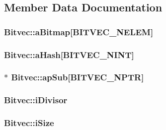 \subsection{Member Data Documentation}
\hypertarget{struct_bitvec_ad0c8d2bbafe74c346a007004086fb56d}{
\subsubsection[{a\-Bitmap}]{ Bitvec\-::a\-Bitmap\mbox{[}{\bf B\-I\-T\-V\-E\-C\-\_\-\-N\-E\-L\-E\-M}\mbox{]}}}\label{struct_bitvec_ad0c8d2bbafe74c346a007004086fb56d}
\hypertarget{struct_bitvec_adcaa47179c109270041bf59f8fe9f8ff}{
\subsubsection[{a\-Hash}]{ Bitvec\-::a\-Hash\mbox{[}{\bf B\-I\-T\-V\-E\-C\-\_\-\-N\-I\-N\-T}\mbox{]}}}\label{struct_bitvec_adcaa47179c109270041bf59f8fe9f8ff}
\hypertarget{struct_bitvec_ab4942527f1862bbd8e1ffe45486d1541}{
\subsubsection[{ap\-Sub}]{$\ast$ Bitvec\-::ap\-Sub\mbox{[}{\bf B\-I\-T\-V\-E\-C\-\_\-\-N\-P\-T\-R}\mbox{]}}}\label{struct_bitvec_ab4942527f1862bbd8e1ffe45486d1541}
\hypertarget{struct_bitvec_a22cdb23eb424e07b6ce922de018a83d9}{
\subsubsection[{i\-Divisor}]{ Bitvec\-::i\-Divisor}}\label{struct_bitvec_a22cdb23eb424e07b6ce922de018a83d9}
\hypertarget{struct_bitvec_ab36df8ece98aee080bae6de28c237de8}{
\subsubsection[{i\-Size}]{ Bitvec\-::i\-Size}}\label{struct_bitvec_ab36df8ece98aee080bae6de28c237de8}
